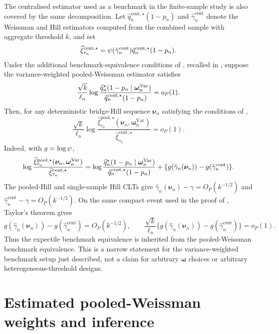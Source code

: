 \begin{remark}
\label{rem:pool-ext:benchmark-equivalence}
The centralised estimator used as a benchmark in the finite-sample study is
also covered by the same decomposition. Let
\(\hat q_n^{\mathrm{cent},\star}(1-p_n)\) and
\(\hat\gamma_n^{\mathrm{cent}}\) denote the Weissman and Hill estimators
computed from the combined sample with aggregate threshold \(k\), and set
\[
  \widehat\xi_{\tau_n}^{\mathrm{cent},\star}
  =
  \psi(\hat\gamma_n^{\mathrm{cent}})
  \hat q_n^{\mathrm{cent},\star}(1-p_n).
\]
Under the additional benchmark-equivalence conditions of
\textcite[Corollary~6, Theorem~3 and Corollary~8]{DaouiaPadoanStupfler2021},
recalled in , suppose the
variance-weighted pooled-Weissman estimator satisfies
\[
  \frac{\sqrt{k}}{\ell_n}
  \log
  \frac{
    \widehat{q}^{\star}_n(1-p_n\mid\bm\omega_n^{\mathrm{Var}})
  }{
    \hat q_n^{\mathrm{cent},\star}(1-p_n)
  }
  =
  o_P(1).
\]
Then, for any deterministic bridge-Hill sequence \(\bm\nu_n\) satisfying the
conditions of ,
\[
  \frac{\sqrt{k}}{\ell_n}
  \log
  \frac{
    \widehat\xi_{\tau_n}^{\mathrm{pool},\star}
    (\bm\nu_n,\bm\omega_n^{\mathrm{Var}})
  }{
    \widehat\xi_{\tau_n}^{\mathrm{cent},\star}
  }
  =
  o_P(1).
\]
Indeed, with \(g=\log\psi\),
\[
  \log
  \frac{
    \widehat\xi_{\tau_n}^{\mathrm{pool},\star}
    (\bm\nu_n,\bm\omega_n^{\mathrm{Var}})
  }{
    \widehat\xi_{\tau_n}^{\mathrm{cent},\star}
  }
  =
  \log
  \frac{\widehat{q}^{\star}_n(1-p_n\mid\bm\omega_n^{\mathrm{Var}})}
       {\hat q_n^{\mathrm{cent},\star}(1-p_n)}
  +
  \{g(\hat\gamma_n(\bm\nu_n))-g(\hat\gamma_n^{\mathrm{cent}})\}.
\]
The pooled-Hill and single-sample Hill CLTs give
\(\hat\gamma_n(\bm\nu_n)-\gamma=O_P(k^{-1/2})\) and
\(\hat\gamma_n^{\mathrm{cent}}-\gamma=O_P(k^{-1/2})\). On the same compact
event used in the proof of , Taylor's
theorem gives
\[
  g(\hat\gamma_n(\bm\nu_n))-g(\hat\gamma_n^{\mathrm{cent}})
  =
  O_P(k^{-1/2}),
  \qquad
  \frac{\sqrt{k}}{\ell_n}
  \{g(\hat\gamma_n(\bm\nu_n))-g(\hat\gamma_n^{\mathrm{cent}})\}
  =
  o_P(1).
\]
Thus the expectile benchmark equivalence is inherited from the
pooled-Weissman benchmark equivalence. This is a narrow statement for the
variance-weighted benchmark setup just described, not a claim for arbitrary
\(\bm\omega\) choices or arbitrary heterogeneous-threshold designs.
\end{remark}

\section{Estimated pooled-Weissman weights and inference}
\label{sec:pool-ext:inference}

